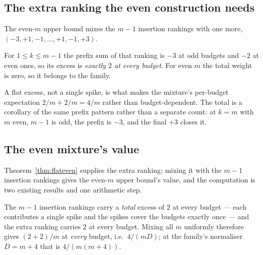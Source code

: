 \subsection{The extra ranking the even construction needs}
\label{sec:flatEven}

The even-$m$ upper bound mixes the $m-1$ insertion rankings with one more,
$(-3,+1,-1,\dots,+1,-1,+3)$.

\begin{theorem}
\label{thm:flateven}
For $1\le k\le m-1$ the prefix sum of that ranking is $-3$ at odd budgets and $-2$ at even
ones, so its excess is \emph{exactly $2$ at every budget}. For even $m$ the total weight is
zero, so it belongs to the family.
\end{theorem}

A flat excess, not a single spike, is what makes the mixture's per-budget expectation
$2/m+2/m=4/m$ rather than budget-dependent. The total is a corollary of the same prefix
pattern rather than a separate count: at $k=m$ with $m$ even, $m-1$ is odd, the prefix is
$-3$, and the final $+3$ closes it.



\subsection{The even mixture's value}
\label{sec:evenmix}

Theorem~\ref{thm:flateven} supplies the extra ranking; mixing it with the $m-1$ insertion
rankings gives the even-$m$ upper bound's value, and the computation is two existing results
and one arithmetic step.

\begin{theorem}
\label{thm:evenmix}
The $m-1$ insertion rankings carry a \emph{total} excess of $2$ at every budget --- each
contributes a single spike and the spikes cover the budgets exactly once --- and the extra
ranking carries $2$ at every budget. Mixing all $m$ uniformly therefore gives $(2+2)/m$ at
\emph{every} budget, i.e.\ $4/(mD)$; at the family's normaliser $D=m+4$ that is
$4/(m(m+4))$.
\end{theorem}

